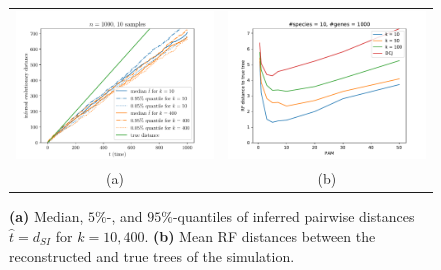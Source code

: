 \documentclass[9pt,english,utf8]{article}
\begin{document}
\begin{figure}[tb]
\begin{center}

\begin{tabular}{cc}
\hspace{-3.5cm}
\includegraphics[width = 3.7in,angle=0]{distance_plot_n1000_s10_inv}
&
\includegraphics[width = 3.7in,angle=0]{boxplot_s10_n1000} \\
\hspace{-3.5cm}
 (a) & %
 (b) 
\end{tabular}

   \caption{\textbf{(a)} Median, $5\%$-, and $95\%$-quantiles of inferred
    pairwise distances $\hat t = d_{SI}$ for $k=10, 400$. \textbf{(b)} Mean RF
distances between the reconstructed and true trees of the simulation. }
\label{fig:results}
\end{center}
\end{figure}
\end{document}
